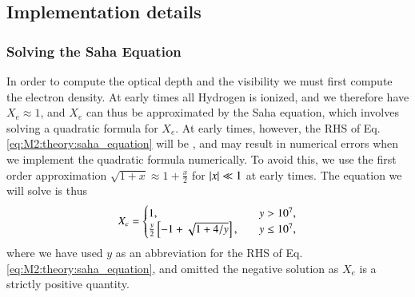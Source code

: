 
\subsection{Implementation details}\label{ssec:M2:implementations} 

\subsubsection{Solving the Saha Equation}\label{sssec:M2:implementations:solving_saha}

In order to compute the optical depth and the visibility we must first compute the electron density. At early times all Hydrogen is ionized, and we therefore have $X_e\approx 1$, and $X_e$ can thus be approximated by the Saha equation, which involves solving a quadratic formula for $X_e$. At early times, however, the RHS of Eq. \eqref{eq:M2:theory:saha_equation} will be , and may result in numerical errors when we implement the quadratic formula numerically. To avoid this, we use the first order approximation $\sqrt{1+x}\approx 1 + \frac{x}{2}$ for $\abs{x}\ll1$ at early times. The equation we will solve is thus 
\begin{equation}
    X_e = \begin{cases}
        1, \quad & y>10^7, \\
        \frac{y}{2}\left[ -1 + \sqrt{1 + 4/y} \right],\quad & y\leq 10^7,
    \end{cases}
\end{equation}  
where we have used $y$ as an abbreviation for the RHS of Eq. \eqref{eq:M2:theory:saha_equation}, and omitted the negative solution as $X_e$ is a strictly positive quantity. 

